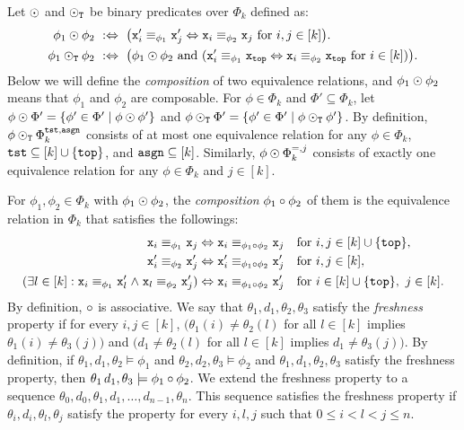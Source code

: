 Let $\odot$ and $\odot_{\mathtt{T}}$ be binary predicates over $\Phi_k$ defined as:
\begin{align*}
  \phi_1\COMPBL\phi_2 \ &:\Leftrightarrow \
      \bigl(\R_i \equiv_{\phi_1} \R_j \Leftrightarrow \L_i \equiv_{\phi_2} \L_j
      \ \text{for } i,j\in[k]\bigr).
  \\
%
  \phi_1\COMPBLT\phi_2 \ &:\Leftrightarrow \
      \bigl(\phi_1\COMPBL\phi_2 \ \text{and} \
      (\R_i \equiv_{\phi_1} \Ltop \Leftrightarrow \L_i \equiv_{\phi_2} \Ltop
      \ \text{for } i\in[k])\bigr).
\end{align*}
Below we will define the \emph{composition} of two equivalence relations,
and $\phi_1\odot\phi_2$ means that
$\phi_1$ and $\phi_2$ are composable.
%
For $\phi\in\Phi_k$ and $\Phi'\subseteq\Phi_k$,
let $\phi\odot\Phi' = \{\phi'\in\Phi' \mid \phi\odot\phi'\}$
and $\phi\odot_{\mathtt{T}}\Phi' = \{\phi'\in\Phi' \mid \phi\odot_{\mathtt{T}}\phi'\}$.
By definition,
$\phi\odot_{\mathtt{T}}\Phi_k^{\mathtt{tst},\mathtt{asgn}}$ consists of at most one equivalence relation
for any $\phi\in\Phi_k$, $\mathtt{tst}\subseteq [k]\cup\{\mathtt{top}\}$,
and $\mathtt{asgn}\subseteq[k]$.
Similarly,
$\phi\odot\Phi_k^{=,j}$ consists of exactly one equivalence relation
for any $\phi\in\Phi_k$ and $j\in [k]$.


For $\phi_1,\phi_2\in\Phi_k$ with $\phi_1\odot\phi_2$,
the \emph{composition} $\phi_1\circ\phi_2$ of them
is the equivalence relation in $\Phi_k$ that satisfies the followings:
\begin{align*}
  {\tt x}_i \equiv_{\phi_1} {\tt x}_j &\Leftrightarrow
  {\tt x}_i \equiv_{\phi_1\circ\phi_2} {\tt x}_j &&\text{for } i,j\in [k]\cup\{\mathtt{top}\},\\
  {\tt x}'_i \equiv_{\phi_2} {\tt x}'_j &\Leftrightarrow
  {\tt x}'_i \equiv_{\phi_1\circ\phi_2} {\tt x}'_j &&\text{for } i,j\in [k],\\
  (\exists l\in [k] : {\tt x}_i \equiv_{\phi_1} {\tt x}'_l \mathrel{\land}
  {\tt x}_l \equiv_{\phi_2} {\tt x}'_j) &\Leftrightarrow
  {\tt x}_i \equiv_{\phi_1\circ\phi_2} {\tt x}'_j
  &&\text{for } i\in[k]\cup\{\mathtt{top}\},\ j\in [k].
\end{align*}
%
By definition, $\circ$ is associative.
We say that
$\theta_1,d_1,\theta_2,\theta_3$ satisfy
the \emph{freshness} property
if for every $i,j\in [k]$,
$\bigl(\theta_1(i)\ne\theta_2(l)$ for all $l\in[k]$
implies $\theta_1(i)\ne\theta_3(j)\bigr)$
and $\bigl(d_1\ne\theta_2(l)$ for all $l\in[k]$
implies $d_1\ne\theta_3(j)\bigr)$.
By definition,
if $\theta_1,d_1,\theta_2\models\phi_1$ and
$\theta_2,d_2,\theta_3\models\phi_2$ and
$\theta_1,d_1,\theta_2,\theta_3$ satisfy the freshness property,
then
$\theta_1\,d_1,\theta_3\models\phi_1\circ\phi_2$.
We extend the freshness property to
a sequence $\theta_0,d_0,\theta_1,d_1,\ldots,d_{n-1},\theta_n$.
This sequence satisfies the freshness property if
$\theta_i,d_i,\theta_l,\theta_j$ satisfy
the property for every $i,l,j$ such that $0\le i < l < j\le n$.

